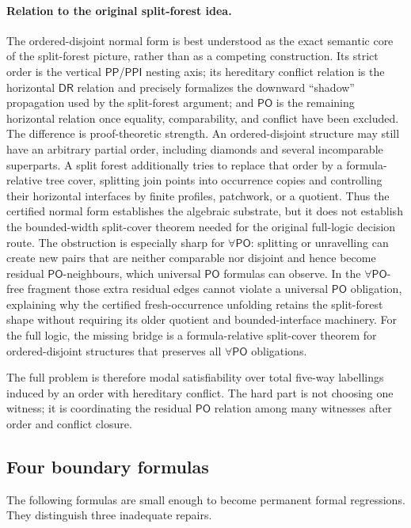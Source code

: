 \documentclass[11pt]{article}
\newcommand{\PO}{\ensuremath{\mathsf{PO}}}
\newcommand{\PP}{\ensuremath{\mathsf{PP}}}
\newcommand{\PPI}{\ensuremath{\mathsf{PPI}}}
\newcommand{\DR}{\ensuremath{\mathsf{DR}}}
\begin{document}
\paragraph{Relation to the original split-forest idea.}
The ordered-disjoint normal form is best understood as the exact semantic core
of the split-forest picture, rather than as a competing construction.  Its
strict order is the vertical \PP/\PPI{} nesting axis; its hereditary conflict
relation is the horizontal \DR{} relation and precisely formalizes the
downward ``shadow'' propagation used by the split-forest argument; and \PO{} is
the remaining horizontal relation once equality, comparability, and conflict
have been excluded.  The difference is proof-theoretic strength.  An
ordered-disjoint structure may still have an arbitrary partial order, including
diamonds and several incomparable superparts.  A split forest additionally
tries to replace that order by a formula-relative tree cover, splitting join
points into occurrence copies and controlling their horizontal interfaces by
finite profiles, patchwork, or a quotient.  Thus the certified normal form
establishes the algebraic substrate, but it does not establish the bounded-width
split-cover theorem needed for the original full-logic decision route.  The
obstruction is especially sharp for \(\forall\PO\): splitting or unravelling can
create new pairs that are neither comparable nor disjoint and hence become
residual \PO-neighbours, which universal \PO{} formulas can observe.  In the
\(\forall\PO\)-free fragment those extra residual edges cannot violate a
universal \PO{} obligation, explaining why the certified fresh-occurrence
unfolding retains the split-forest shape without requiring its older quotient
and bounded-interface machinery.  For the full logic, the missing bridge is a
formula-relative split-cover theorem for ordered-disjoint structures that
preserves all \(\forall\PO\) obligations.

The full problem is therefore modal satisfiability over total five-way
labellings induced by an order with hereditary conflict.  The hard part is not
choosing one witness; it is coordinating the residual \PO{} relation among
many witnesses after order and conflict closure.

\subsection{Four boundary formulas}

The following formulas are small enough to become permanent formal regressions.
They distinguish three inadequate repairs.
\end{document}
